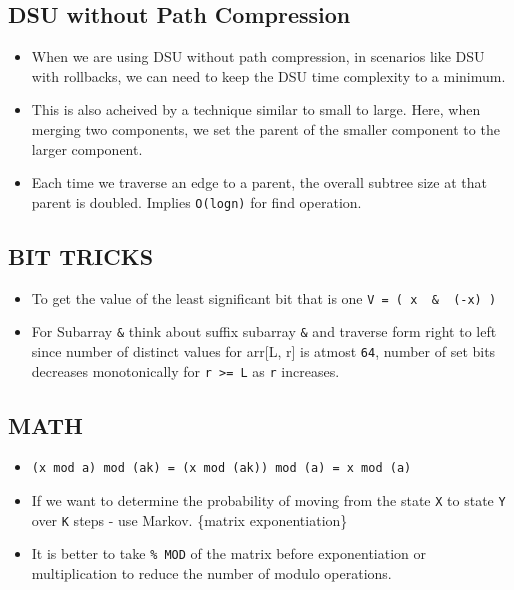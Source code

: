 \hypertarget{dsu-without-path-compression}{%
\subsection{DSU without Path
Compression}\label{dsu-without-path-compression}}

\begin{itemize}
\tightlist
\item
  When we are using DSU without path compression, in scenarios like DSU
  with rollbacks, we can need to keep the DSU time complexity to a
  minimum.
\item
  This is also acheived by a technique similar to small to large. Here,
  when merging two components, we set the parent of the smaller
  component to the larger component.
\item
  Each time we traverse an edge to a parent, the overall subtree size at
  that parent is doubled. Implies \texttt{O(logn)} for find operation.
\end{itemize}

\hypertarget{bit-tricks}{%
\subsection{BIT TRICKS}\label{bit-tricks}}

\begin{itemize}
\tightlist
\item
  To get the value of the least significant bit that is one
  \texttt{V\ =\ (\ x\ \ \&\ \ (-x)\ )}
\item
  For Subarray \texttt{\&} think about suffix subarray \texttt{\&} and
  traverse form right to left since number of distinct values for
  arr{[}L, r{]} is atmost \texttt{64}, number of set bits decreases
  monotonically for \texttt{r\ \textgreater{}=\ L} as \texttt{r}
  increases.
\end{itemize}

\hypertarget{math}{%
\subsection{MATH}\label{math}}

\begin{itemize}
\tightlist
\item
  \texttt{(x\ mod\ a)\ mod\ (ak)\ =\ (x\ mod\ (ak))\ mod\ (a)\ =\ x\ mod\ (a)}
\item
  If we want to determine the probability of moving from the state
  \texttt{X} to state \texttt{Y} over \texttt{K} steps - use Markov.
  \{matrix exponentiation\}
\item
  It is better to take \texttt{\%\ MOD} of the matrix before
  exponentiation or multiplication to reduce the number of modulo
  operations.
\end{itemize}

